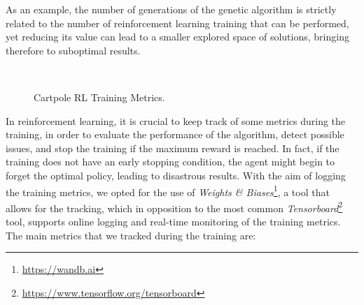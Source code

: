 As an example, the number of generations of the genetic algorithm is strictly related to the number of reinforcement learning training that can be performed, yet reducing its value can lead to a smaller explored space of solutions, bringing therefore to suboptimal results.

\begin{figure}
    \centering
    \caption{Cartpole RL Training Metrics.}
    \label{fig:cartpoleresults}
     \\
\end{figure}

In reinforcement learning, it is crucial to keep track of some metrics during the training, in order to evaluate the performance of the algorithm, detect possible issues, and stop the training if the maximum reward is reached. In fact, if the training does not have an early stopping condition, the agent might begin to forget the optimal policy, leading to disastrous results. With the aim of logging the training metrics, we opted for the use of \textit{Weights {\&} Biases}\footnote{\url{https://wandb.ai}}, a tool that allows for the tracking, which in opposition to the most common \textit{Tensorboard}\footnote{\url{https://www.tensorflow.org/tensorboard}} tool, supports online logging and real-time monitoring of the training metrics. The main metrics that we tracked during the training are:


